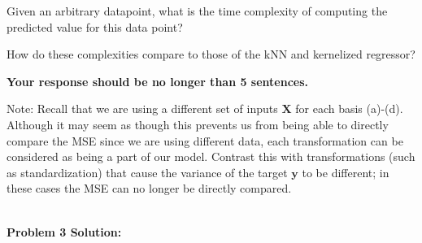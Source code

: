 \documentclass[submit]{harvardml}
\begin{document}
\begin{framed}
\begin{enumerate}
Given an arbitrary datapoint, what is the time complexity of computing the predicted value for this data point?

How do these complexities compare to those of the kNN and kernelized regressor?

\textbf{Your response should be no longer than 5 sentences.}

\end{enumerate}
Note:
Recall that we are using a 
different set of inputs $\mathbf{X}$ for each basis (a)-(d). 
Although it may seem as though this prevents us from being able 
to directly compare the MSE since we are using different data, 
each transformation can be considered as being a part of our model. 
Contrast this with transformations (such as standardization) that cause the variance
of the target $\mathbf{y}$ to be different; in these cases the
MSE can no longer be directly compared.

\end{framed}\\
\newpage
\textbf{Problem 3 Solution:}\\
\end{document}
